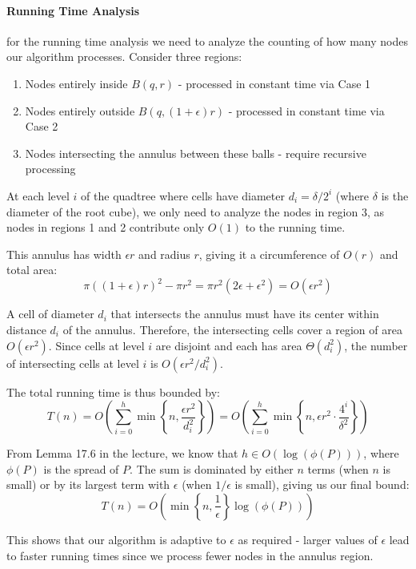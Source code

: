 \documentclass{article}
\begin{document}
\paragraph{Running Time Analysis} for the running time analysis we need to analyze the counting of how many nodes our algorithm processes. Consider three regions:

\begin{enumerate}
    \item Nodes entirely inside $B(q,r)$ - processed in constant time via Case 1
    \item Nodes entirely outside $B(q,(1+\epsilon)r)$ - processed in constant time via Case 2
    \item Nodes intersecting the annulus between these balls - require recursive processing
\end{enumerate}

At each level $i$ of the quadtree where cells have diameter $d_i = \delta/2^i$ (where $\delta$ is the diameter of the root cube), we only need to analyze the nodes in region 3, as nodes in regions 1 and 2 contribute only $O(1)$ to the running time.

This annulus has width $\epsilon r$ and radius $r$, giving it a circumference of $O(r)$ and total area:
\[
\pi((1+\epsilon)r)^2 - \pi r^2 = \pi r^2(2\epsilon + \epsilon^2) = O(\epsilon r^2)
\]

A cell of diameter $d_i$ that intersects the annulus must have its center within distance $d_i$ of the annulus. Therefore, the intersecting cells cover a region of area $O(\epsilon r^2)$. Since cells at level $i$ are disjoint and each has area $\Theta(d_i^2)$, the number of intersecting cells at level $i$ is $O(\epsilon r^2/d_i^2)$.

The total running time is thus bounded by:
\[
T(n) = O\left(\sum_{i=0}^h \min\left\{n, \frac{\epsilon r^2}{d_i^2}\right\}\right) = O\left(\sum_{i=0}^h \min\left\{n, \epsilon r^2 \cdot \frac{4^i}{\delta^2}\right\}\right)
\]

From Lemma 17.6 in the lecture, we know that $h \in O(\log(\phi(P)))$, where $\phi(P)$ is the spread of $P$. The sum is dominated by either $n$ terms (when $n$ is small) or by its largest term with $\epsilon$ (when $1/\epsilon$ is small), giving us our final bound:
\[
T(n) = O\left(\min\left\{n, \frac{1}{\epsilon}\right\}\log(\phi(P))\right)
\]

This shows that our algorithm is adaptive to $\epsilon$ as required - larger values of $\epsilon$ lead to faster running times since we process fewer nodes in the annulus region.
\end{document}
